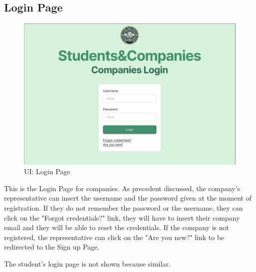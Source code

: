 \subsection{Login Page}
\begin{figure}[H]
    \centering
    \includegraphics[width=15cm]{images/ui/login.jpg}
    \caption{UI: Login Page}
\end{figure}
This is the Login Page for companies. As precedent discussed, the company's representative can insert the username and the password given at the moment of registration. If they do not remember the password or the username, they can click on the "Forgot credentials?" link, they will have to insert their company email and they will be able to reset the credentials. If the company is not registered, the representative can click on the "Are you new?" link to be redirected to the Sign up Page.

The student's login page is not shown because similar.

